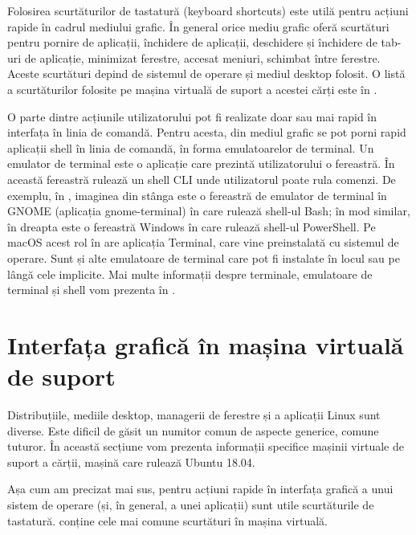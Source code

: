Folosirea scurtăturilor de tastatură (keyboard shortcuts) este utilă pentru acțiuni rapide în cadrul mediului grafic. În general orice mediu grafic oferă scurtături pentru pornire de aplicații, închidere de aplicații, deschidere și închidere de tab-uri de aplicație, minimizat ferestre, accesat meniuri, schimbat între ferestre. Aceste scurtături depind de sistemul de operare și mediul desktop folosit. O listă a scurtăturilor folosite pe mașina virtuală de suport a acestei cărți este în .

O parte dintre acțiunile utilizatorului pot fi realizate doar sau mai rapid în interfața în linia de comandă. Pentru acesta, din mediul grafic se pot porni rapid aplicații shell în linia de comandă, în forma emulatoarelor de terminal. Un emulator de terminal este o aplicație care prezintă utilizatorului o fereastră. În această fereastră rulează un shell CLI unde utilizatorul poate rula comenzi. De exemplu, în , imaginea din stânga este o fereastră de emulator de terminal în GNOME (aplicația gnome-terminal) în care rulează shell-ul Bash; în mod similar, în dreapta este o fereastră Windows în care rulează shell-ul PowerShell. Pe macOS acest rol în are aplicația Terminal, care vine preinstalată cu sistemul de operare. Sunt și alte emulatoare de terminal care pot fi instalate în locul sau pe lângă cele implicite. Mai multe informații despre terminale, emulatoare de terminal și shell vom prezenta în .

\section{Interfața grafică în mașina virtuală de suport}
\label{sec:ui:vm}

Distribuțiile, mediile desktop, managerii de ferestre și a aplicații Linux sunt diverse. Este dificil de găsit un numitor comun de aspecte generice, comune tuturor. În această secțiune vom prezenta informații specifice mașinii virtuale de suport a cărții, mașină care rulează Ubuntu 18.04.

Așa cum am precizat mai sus, pentru acțiuni rapide în interfața grafică a unui sistem de operare (și, în general, a unei aplicații) sunt utile scurtăturile de tastatură.  conține cele mai comune scurtături în mașina virtuală.


